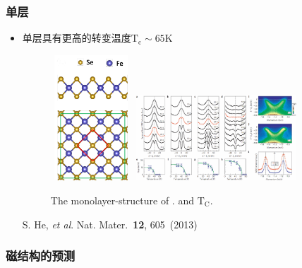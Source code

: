 \documentclass[cjk,slidestop,compress,mathserif,blue]{beamer}
\begin{document}
\frame
{
	\frametitle{单层}
	\begin{itemize}
\item 单层具有更高的转变温度$\mathrm{T_c}\sim65\mathrm{K}$
\begin{figure}[h!]
\vspace*{-0.08in}
\centering
\includegraphics[height=1.85in,width=1.20in]{Figures/FeSe-struct-1.png}
\hskip 0.5pt
\includegraphics[height=1.25in,width=2.40in]{Figures/FeSe-single-Mag-Tc.png}
\caption{\tiny \textrm{The monolayer-structure of . and $\mathrm{T_C}$. }}%
\label{Fig:Mag-surface-FeSe}
\end{figure}
\textrm{S. He, \textit{et al}.  Nat. Mater. \textbf{12}, 605~(2013)}
	\end{itemize}
}

\frame
{
	\frametitle{磁结构的预测}
}

\appendix
\end{document}
